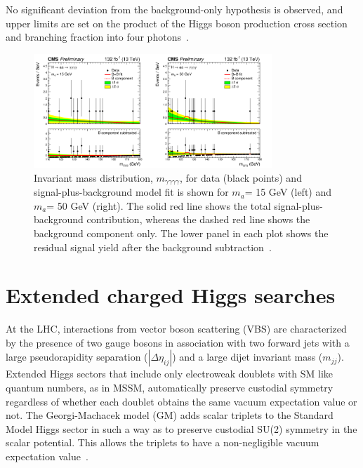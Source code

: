 \documentclass{blois}
\begin{document}
No significant deviation from the background-only hypothesis is observed, and upper limits are set on the product of the Higgs boson production cross section and branching fraction into four photons~\cite{CMS-PAS-HIG-21-003}.
\begin{figure}[!htb]
    \begin{center}
        \includegraphics[width=0.8\textwidth]{CMS-PAS-HIG-21-003_Figure_006.png}
        \caption{
           Invariant mass distribution, $m_{\gamma\gamma\gamma\gamma}$, for data (black points) and signal-plus-background model fit is shown for $m_{a}$= 15 GeV (left) and $m_{a}$= 50 GeV (right). The solid red line shows the total signal-plus-background contribution, whereas the dashed red line shows the background component only. The lower panel in each plot shows the residual signal yield after the background subtraction~\protect\cite{CMS-PAS-HIG-21-003}.
        }
        \label{fig:exo_limits}
    \end{center}
\end{figure}
\section{Extended charged Higgs searches}

At the LHC, interactions from vector boson scattering (VBS) are characterized by the presence of two gauge bosons in association with two forward jets with a large pseudorapidity separation ($|\Delta\eta_{ij}|$) and a large dijet invariant mass ($m_{jj}$).
Extended Higgs sectors that include only electroweak doublets with SM like quantum
numbers, as in MSSM, automatically preserve custodial
symmetry~\cite{Low:2010jp} regardless of whether each doublet obtains the same vacuum expectation
value or not. The Georgi-Machacek model (GM) adds scalar triplets to the Standard Model Higgs sector in such a way as to preserve custodial SU(2) symmetry in the scalar potential. This allows the triplets to have a non-negligible vacuum expectation value~\cite{Vega2017TheSG}.
\end{document}
